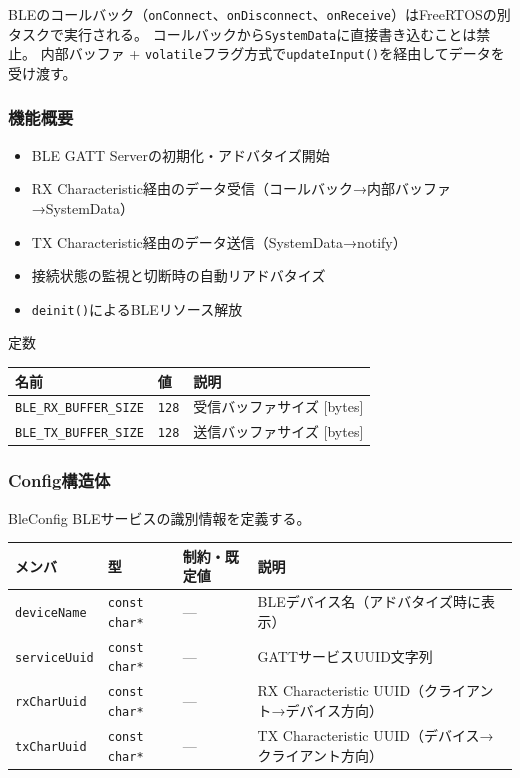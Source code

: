 \begin{cautionbox}[スレッドセーフティ]
BLEのコールバック（\texttt{onConnect}、\texttt{onDisconnect}、\texttt{onReceive}）はFreeRTOSの別タスクで実行される。
コールバックから\texttt{SystemData}に直接書き込むことは禁止。
内部バッファ + \texttt{volatile}フラグ方式で\texttt{updateInput()}を経由してデータを受け渡す。
\end{cautionbox}

\subsubsection{機能概要}

\begin{itemize}
    \item BLE GATT Serverの初期化・アドバタイズ開始
    \item RX Characteristic経由のデータ受信（コールバック→内部バッファ→SystemData）
    \item TX Characteristic経由のデータ送信（SystemData→notify）
    \item 接続状態の監視と切断時の自動リアドバタイズ
    \item \texttt{deinit()}によるBLEリソース解放
\end{itemize}

\begin{funcblock}{定数}
\begin{tabularx}{\textwidth}{l l X}
\toprule
\textbf{名前} & \textbf{値} & \textbf{説明} \\
\midrule
\texttt{BLE\_RX\_BUFFER\_SIZE} & \texttt{128} & 受信バッファサイズ [bytes] \\
\texttt{BLE\_TX\_BUFFER\_SIZE} & \texttt{128} & 送信バッファサイズ [bytes] \\
\bottomrule
\end{tabularx}
\end{funcblock}

\subsubsection{Config構造体}

\begin{funcblock}{BleConfig}
BLEサービスの識別情報を定義する。

\begin{longtable}{l l l p{4.5cm}}
\toprule
\textbf{メンバ} & \textbf{型} & \textbf{制約・既定値} & \textbf{説明} \\
\midrule
\endhead
\texttt{deviceName}  & \texttt{const char*} & ---  & BLEデバイス名（アドバタイズ時に表示） \\
\texttt{serviceUuid} & \texttt{const char*} & ---  & GATTサービスUUID文字列 \\
\texttt{rxCharUuid}  & \texttt{const char*} & ---  & RX Characteristic UUID（クライアント→デバイス方向） \\
\texttt{txCharUuid}  & \texttt{const char*} & ---  & TX Characteristic UUID（デバイス→クライアント方向） \\
\bottomrule
\end{longtable}
\end{funcblock}

